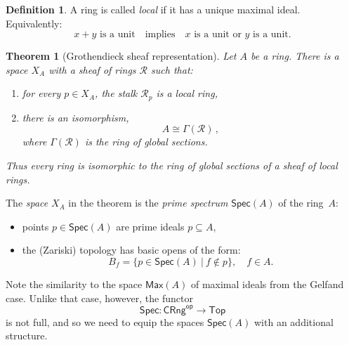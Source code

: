 \documentclass[12pt]{article}
\newtheorem*{theorem*}{Theorem}
\theoremstyle{remark}
\theoremstyle{definition}
\newtheorem*{definition*}{Definition}
\newcommand{\myemph}[1]{\emph{#1}}
\begin{document}

\begin{definition*} A  ring is called \emph{local} if it has a unique maximal ideal. \\
Equivalently: 
\begin{equation}\label{eq:localring}
\text{$x+y$ is a unit}\quad\text{implies}\quad\text{$x$ is a unit or $y$ is a unit}.
\end{equation}
\end{definition*}
%
\begin{theorem*}[Grothendieck sheaf representation]
Let $A$ be a ring.  There is a space $X_A$ with a sheaf of rings $\mathcal{R}$ such that:
\begin{enumerate}
\item for every $p\in X_A$, the stalk $\mathcal{R}_p$ is a local ring, 
\item there is an isomorphism, $$A\cong \Gamma(\mathcal{R})\,,$$
where $\Gamma(\mathcal{R})$ is the ring of global sections.
\end{enumerate}
Thus every ring is isomorphic to the ring of global sections of a sheaf of local rings.
\end{theorem*}


The \myemph{space} $X_A$ in the theorem is the \emph{prime spectrum} $\mathsf{Spec}(A)$ of the ring~$A$:
 \begin{itemize}
\item points $p\in \mathsf{Spec}(A)$ are prime ideals $p\subseteq A$,
\item the (Zariski) topology has basic opens of the form:
 $$B_f = \{ p\in \mathsf{Spec}(A)\ |\ f\not\in p \}, \quad f\in A.$$
\end{itemize}
Note the similarity to the space $\mathsf{Max}(A)$ of maximal ideals from the Gelfand case.  
Unlike that case, however, the functor 
\[
\mathsf{Spec} : \mathsf{CRng}^\mathsf{op} \to \mathsf{Top}
 \]
is not full, and so we need to equip the spaces  $\mathsf{Spec}(A)$ with an additional structure.
\end{document}
